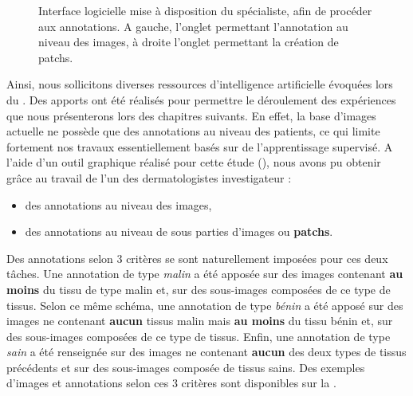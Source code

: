 \begin{figure}[H]
\begin{subfigure}{.45\textwidth}
    \end{subfigure}
    \caption{Interface logicielle mise à disposition du spécialiste, afin de procéder aux annotations. A gauche, l'onglet permettant l'annotation au niveau des images, à droite l'onglet permettant la création de patchs.}
    \label{fig:example_gui_annotation}
\end{figure}

Ainsi, nous sollicitons diverses ressources d'intelligence artificielle évoquées lors du . Des apports ont été réalisés pour permettre le déroulement des expériences que nous présenterons lors des chapitres suivants. En effet, la base d'images actuelle ne possède que des annotations au niveau des patients, ce qui limite fortement nos travaux essentiellement basés sur de l'apprentissage supervisé. A l'aide d'un outil graphique réalisé pour cette étude (), nous avons pu obtenir grâce au travail de l'un des dermatologistes investigateur :
\begin{itemize}
    \item des annotations au niveau des images,
    \item des annotations au niveau de sous parties d'images ou \textbf{patchs}.
\end{itemize}\par

Des annotations selon 3 critères se sont naturellement imposées pour ces deux tâches. Une annotation de type \textit{malin} a été apposée sur des images contenant \textbf{au moins} du tissu de type malin et, sur des sous-images composées de ce type de tissus. Selon ce même schéma, une annotation de type \textit{bénin} a été apposé sur des images ne contenant \textbf{aucun} tissus malin mais \textbf{au moins} du tissu bénin et, sur des sous-images composées de ce type de tissus. Enfin, une annotation de type \textit{sain} a été renseignée sur des images ne contenant \textbf{aucun} des deux types de tissus précédents et sur des sous-images composée de tissus sains. Des exemples d'images et annotations selon ces 3 critères sont disponibles sur la .\par

